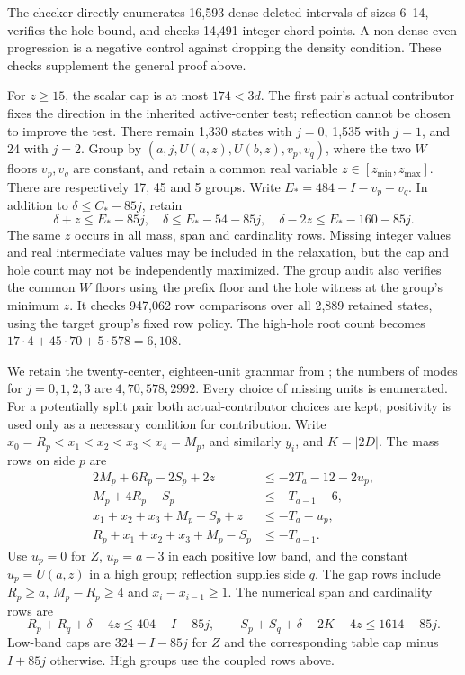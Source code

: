 \documentclass[11pt,a4paper]{article}
\begin{document}
The checker directly enumerates 16,593 dense deleted intervals of sizes
6--14, verifies the hole bound, and checks 14,491 integer chord points.
A non-dense even progression is a negative control against dropping the
density condition. These checks supplement the general proof above.

For $z\ge15$, the scalar cap is at most $174<3d$.
The first pair's actual contributor fixes the direction in the inherited
active-center test; reflection cannot be chosen to improve the test.
There remain 1,330 states with $j=0$, 1,535 with $j=1$, and 24 with
$j=2$. Group by $(a,j,U(a,z),U(b,z),v_p,v_q)$, where the two $W$ floors
$v_p,v_q$ are constant, and retain a common real variable
$z\in[z_{\min},z_{\max}]$. There are respectively 17, 45 and 5 groups.
Write $E_*=484-I-v_p-v_q$. In addition to
$\delta\le C_*-85j$, retain
\[
 \delta+z\le E_*-85j,\quad
 \delta\le E_*-54-85j,\quad
 \delta-2z\le E_*-160-85j.
\]
The same $z$ occurs in all mass, span and cardinality rows. Missing
integer values and real intermediate values may be included in the
relaxation, but the cap and hole count may not be independently maximized.
The group audit also verifies the common $W$ floors using the prefix
floor and the hole witness at the group's minimum $z$. It checks 947,062 row comparisons over all 2,889
retained states, using the target group's fixed row policy.
The high-hole root count becomes
$17\cdot4+45\cdot70+5\cdot578=6,108$.

We retain the twenty-center, eighteen-unit grammar from
\cite{overlap,previous}; the numbers of modes for $j=0,1,2,3$ are
$4,70,578,2992$. Every choice of missing units is enumerated.
For a potentially split pair both actual-contributor choices are kept;
positivity is used only as a necessary condition for contribution.
Write $x_0=R_p<x_1<x_2<x_3<x_4=M_p$, and similarly $y_i$, and
$K=|2D|$. The mass rows on side $p$ are
\begin{align*}
2M_p+6R_p-2S_p+2z&\le-2T_a-12-2u_p,\\
M_p+4R_p-S_p&\le-T_{a-1}-6,\\
x_1+x_2+x_3+M_p-S_p+z&\le-T_a-u_p,\\
R_p+x_1+x_2+x_3+M_p-S_p&\le-T_{a-1}.
\end{align*}
Use $u_p=0$ for $Z$, $u_p=a-3$ in each positive low band, and the
constant $u_p=U(a,z)$ in a high group; reflection supplies side $q$.
The gap rows include $R_p\ge a$, $M_p-R_p\ge4$ and
$x_i-x_{i-1}\ge1$. The numerical span and cardinality rows are
\[
 R_p+R_q+\delta-4z\le404-I-85j,\qquad
 S_p+S_q+\delta-2K-4z\le1614-85j.
\]
Low-band caps are $324-I-85j$ for $Z$ and the corresponding table cap
minus $I+85j$ otherwise. High groups use the coupled rows above.
\end{document}
